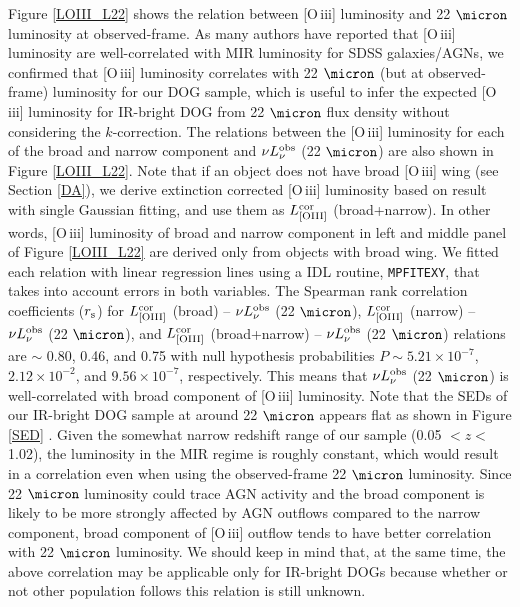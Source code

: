 \documentclass[twocolumn]{aastex6}
\newcommand{\oiii}{[O{\,\sc iii}]\,\,}
\begin{document}
Figure \ref{LOIII_L22} shows the relation between \oiii luminosity and 22 $\micron$ luminosity at observed-frame.
As many authors have reported that \oiii luminosity are well-correlated with MIR luminosity \cite[e.g., ][]
{Toba_14,Yuan,Sun_17} for SDSS galaxies/AGNs, we confirmed that \oiii luminosity correlates with 22 $\micron$ (but at observed-frame) luminosity for our DOG sample, which is useful to infer the expected \oiii luminosity for IR-bright DOG from 22 $\micron$ flux density without considering the $k$-correction.
The relations between the \oiii luminosity for each of the broad and narrow component and $\nu L^{\rm obs}_{\nu}$ (22 $\micron$) are also shown in Figure \ref{LOIII_L22}.
Note that if an object does not have broad \oiii wing (see Section \ref{DA}), we derive extinction corrected \oiii luminosity based on result with single Gaussian fitting, and use them as $L_{\rm {[OIII]}}^{\rm cor}$ (broad+narrow).
In other words, \oiii luminosity of broad and narrow component in left and middle panel of Figure \ref{LOIII_L22} are derived only from objects with broad wing.
We fitted each relation with linear regression lines using a IDL routine, {\tt MPFITEXY}, that takes into account errors in both variables.  
The Spearman rank correlation coefficients ($r_{\rm s}$) for $L_{\rm {[OIII]}}^{\rm cor}$ (broad) -- $\nu L^{\rm obs}_{\nu}$ (22 $\micron$), $L_{\rm {[OIII]}}^{\rm cor}$ (narrow) -- $\nu L^{\rm obs}_{\nu}$ (22 $\micron$), and $L_{\rm {[OIII]}}^{\rm cor}$ (broad+narrow) -- $\nu L^{\rm obs}_{\nu}$ (22 $\micron$) relations are $\sim$ 0.80, 0.46, and 0.75 with null hypothesis probabilities $P \sim 5.21 \times 10^{-7}$, $2.12 \times 10^{-2}$, and $9.56 \times 10^{-7}$, respectively.
This means that $\nu L^{\rm obs}_{\nu}$ (22 $\micron$) is well-correlated with broad component of \oiii luminosity.   
Note that the SEDs of our IR-bright DOG sample at around 22 $\micron$ appears flat as shown in Figure \ref{SED} \citep[see also][]{Toba_17b}.
Given the somewhat narrow redshift range of our sample (0.05 $< z <$ 1.02), the luminosity in the MIR regime is roughly constant, which would result in a correlation even when using the observed-frame 22 $\micron$ luminosity.
Since 22 $\micron$ luminosity could trace AGN activity and the broad component is likely to be more strongly affected by AGN outflows compared to the narrow component, broad component of \oiii outflow tends to have better correlation with 22 $\micron$ luminosity.
We should keep in mind that, at the same time, the above correlation may be applicable only for IR-bright DOGs because whether or not other population follows this relation is still unknown.
\end{document}
